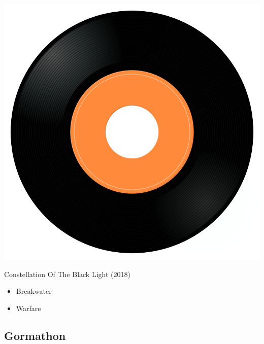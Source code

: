 \begin{minipage}[t]{0.25\textwidth}\vspace{0pt}
\captionsetup{type=figure}
\includegraphics[width=\textwidth]{Images/cover.png}
\caption*{Constellation Of The Black Light (2018)}
\end{minipage}
\begin{minipage}[t]{0.25\textwidth}\vspace{0pt}
\begin{itemize}[nosep,leftmargin=1em,labelwidth=*,align=left]
	\setlength{\itemsep}{0pt}
	\item Breakwater
	\item Warfare
\end{itemize}
\end{minipage}


\subsection{Gormathon}

